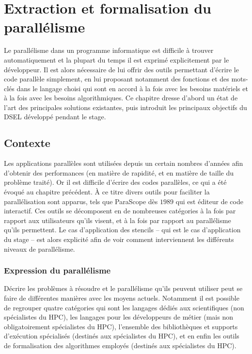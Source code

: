 
\chapter{Extraction et formalisation du parallélisme}

Le parallélisme dans un programme informatique est difficile à trouver automatiquement et la plupart du temps il est exprimé explicitement par le développeur. Il est alors nécessaire de lui offrir des outils permettant d'écrire le code parallèle simplement, en lui proposant notamment des fonctions et des mots-clés dans le langage choisi qui sont en accord à la fois avec les besoins matériels et à la fois avec les besoins algorithmiques. Ce chapitre dresse d'abord un état de l'art des principales solutions existantes, puis introduit les principaux objectifs du DSEL développé pendant le stage.

\section{Contexte}

Les applications parallèles sont utilisées depuis un certain nombres d'années afin d'obtenir des performances (en matière de rapidité, et en matière de taille du problème traité). Or il est difficile d'écrire des codes parallèles, ce qui a été évoqué au chapitre précédent. À ce titre divers outils pour faciliter la parallélisation sont apparus, tels que \textsf{ParaScope} dès $1989$ \cite{Art24} qui est éditeur de code interactif. Ces outils se décomposent en de nombreuses catégories à la fois par rapport aux utilisateurs qu'ils visent, et à la fois par rapport au parallélisme qu'ils permettent. Le cas d'application des stencils -- qui est le cas d'application du stage -- est alors explicité afin de voir comment interviennent les différents niveaux de parallélisme. 

\subsection{Expression du parallélisme}

Décrire les problèmes à résoudre et le parallélisme qu'ils peuvent utiliser peut se faire de différentes manières avec les moyens actuels. Notamment il est possible de regrouper quatre catégories qui sont les langages dédiés aux scientifiques (non spécialistes du HPC), les langages pour les développeurs de métier (mais non obligatoirement spécialistes du HPC), l'ensemble des bibliothèques et supports d'exécution spécialisés (destinés aux spécialistes du HPC), et en enfin les outils de formalisation des algorithmes employés (destinés aux spécialistes du HPC).

